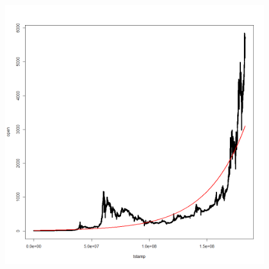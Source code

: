 \documentclass{article}
\begin{document}
\begin{figure}[H]
\includegraphics[width=\textwidth]{Exponential.png}
\end{figure}
	
\end{document}
